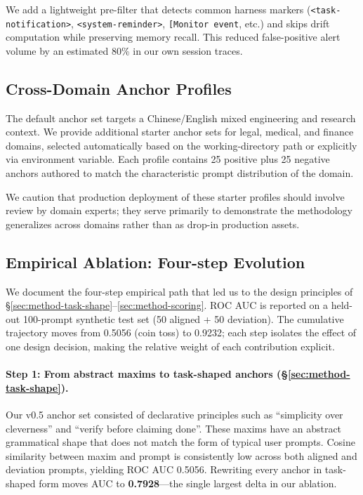 We add a lightweight pre-filter that detects common harness
markers (\texttt{<task-notification>},
\texttt{<system-reminder>}, \texttt{[Monitor event}, etc.) and
skips drift computation while preserving memory recall. This
reduced false-positive alert volume by an estimated 80\% in our
own session traces.

\subsection{Cross-Domain Anchor Profiles}
\label{sec:method-domains}

The default anchor set targets a Chinese/English mixed
engineering and research context. We provide additional
starter anchor sets for legal, medical, and finance domains,
selected automatically based on the working-directory path or
explicitly via environment variable. Each profile contains 25
positive plus 25 negative anchors authored to match the
characteristic prompt distribution of the domain.

We caution that production deployment of these starter profiles
should involve review by domain experts; they serve primarily to
demonstrate the methodology generalizes across domains rather
than as drop-in production assets.

\subsection{Empirical Ablation: Four-step Evolution}
\label{sec:method-evolution}

We document the four-step empirical path that led us to the
design principles of \S\ref{sec:method-task-shape}--\ref{sec:method-scoring}.
ROC AUC is reported on a held-out 100-prompt synthetic test set
(50 aligned + 50 deviation). The cumulative trajectory moves
from 0.5056 (coin toss) to 0.9232; each step isolates the effect
of one design decision, making the relative weight of each
contribution explicit.

\paragraph{Step 1: From abstract maxims to task-shaped anchors
(\S\ref{sec:method-task-shape}).}
Our v0.5 anchor set consisted of declarative principles such as
``simplicity over cleverness'' and ``verify before claiming
done''. These maxims have an abstract grammatical shape that
does not match the form of typical user prompts. Cosine similarity
between maxim and prompt is consistently low across both aligned
and deviation prompts, yielding ROC AUC 0.5056. Rewriting every
anchor in task-shaped form moves AUC to \textbf{0.7928}---the
single largest delta in our ablation.

